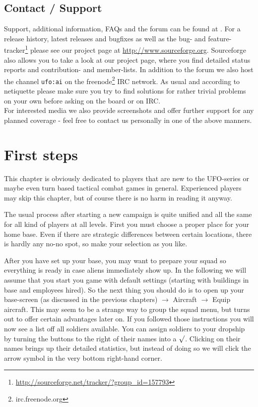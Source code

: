 
\subsection{Contact / Support}
Support, additional information, FAQs and the forum can be found at \ufohomepage.
For a release history, latest releases and bugfixes as well as the bug- and feature-tracker\footnote{\url{http://sourceforge.net/tracker/?group_id=157793}} please see our project page at \url{http://www.sourceforge.org}.
Sourceforge also allows you to take a look at our project page, where you find detailed status reports and contribution- and member-lists. In addition to the forum we also host the channel \texttt{ufo:ai} on the freenode\footnote{irc.freenode.org} IRC network. As usual and according to netiquette please make sure you try to find solutions for rather trivial problems on your own before asking on the board or on IRC.\\
For interested media we also provide screenshots and offer further support for any planned coverage - feel free to contact us personally in one of the above manners.

\section{First steps}
This chapter is obviously dedicated to players that are new to the UFO-series or maybe even turn based tactical combat games in general. Experienced players may skip this chapter, but of course there is no harm in reading it anyway.

The usual process after starting a new campaign is quite unified and all the same for all kind of players at all levels. First you must choose a proper place for your home base. Even if there are strategic differences between certain locations, there is hardly any no-no spot, so make your selection as you like.

After you have set up your base, you may want to prepare your squad so everything is ready in case aliens immediately show up. In the following we will assume that you start you game with default settings (starting with buildings in base and employees hired). So the next thing you should do is to open up your base-screen (as discussed in the previous chapters) 
$\rightarrow$ Aircraft $\rightarrow$ Equip aircraft. This may seem to be a strange way to group the squad menu, but turns out to offer certain advantages later on. If you followed those instructions you will now see a list off all soldiers available. You can assign soldiers to your dropship by turning the  buttons to the right of their names into a $\surd$. Clicking on their names brings up their detailed statistics, but instead of doing so we will click the arrow symbol in the very bottom right-hand corner.

